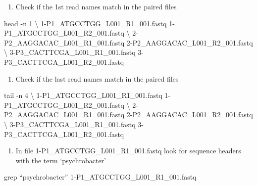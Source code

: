 \documentclass[
  letterpaper,
  DIV=11,
  numbers=noendperiod]{scrreprt}
\newenvironment{Shaded}{\begin{snugshade}}{\end{snugshade}}
\newcommand{\AttributeTok}[1]{\textcolor[rgb]{0.40,0.45,0.13}{#1}}
\newcommand{\DataTypeTok}[1]{\textcolor[rgb]{0.68,0.00,0.00}{#1}}
\newcommand{\FunctionTok}[1]{\textcolor[rgb]{0.28,0.35,0.67}{#1}}
\newcommand{\NormalTok}[1]{\textcolor[rgb]{0.00,0.23,0.31}{#1}}
\providecommand{\tightlist}{%
  \setlength{\itemsep}{0pt}\setlength{\parskip}{0pt}}\usepackage{longtable,booktabs,array}
\begin{document}
\begin{enumerate}
\def\labelenumi{\arabic{enumi}.}
\setcounter{enumi}{6}
\tightlist
\item
  Check if the 1st read names match in the paired files
\end{enumerate}

\begin{Shaded}
\begin{Highlighting}[]
\FunctionTok{head} \AttributeTok{{-}n}\NormalTok{ 1 }\DataTypeTok{\textbackslash{}}
\NormalTok{1{-}P1\_ATGCCTGG\_L001\_R1\_001.fastq 1{-}P1\_ATGCCTGG\_L001\_R2\_001.fastq }\DataTypeTok{\textbackslash{}}
\NormalTok{2{-}P2\_AAGGACAC\_L001\_R1\_001.fastq 2{-}P2\_AAGGACAC\_L001\_R2\_001.fastq }\DataTypeTok{\textbackslash{}}
\NormalTok{3{-}P3\_CACTTCGA\_L001\_R1\_001.fastq 3{-}P3\_CACTTCGA\_L001\_R2\_001.fastq }
\end{Highlighting}
\end{Shaded}

\begin{enumerate}
\def\labelenumi{\arabic{enumi}.}
\setcounter{enumi}{7}
\tightlist
\item
  Check if the last read names match in the paired files
\end{enumerate}

\begin{Shaded}
\begin{Highlighting}[]
\FunctionTok{tail} \AttributeTok{{-}n}\NormalTok{ 4 }\DataTypeTok{\textbackslash{}}
\NormalTok{1{-}P1\_ATGCCTGG\_L001\_R1\_001.fastq 1{-}P1\_ATGCCTGG\_L001\_R2\_001.fastq }\DataTypeTok{\textbackslash{}}
\NormalTok{2{-}P2\_AAGGACAC\_L001\_R1\_001.fastq 2{-}P2\_AAGGACAC\_L001\_R2\_001.fastq }\DataTypeTok{\textbackslash{}}
\NormalTok{3{-}P3\_CACTTCGA\_L001\_R1\_001.fastq 3{-}P3\_CACTTCGA\_L001\_R2\_001.fastq }
\end{Highlighting}
\end{Shaded}

\begin{enumerate}
\def\labelenumi{\arabic{enumi}.}
\setcounter{enumi}{8}
\tightlist
\item
  In file 1-P1\_ATGCCTGG\_L001\_R1\_001.fastq look for sequence headers
  with the term `psychrobacter'
\end{enumerate}

\begin{Shaded}
\begin{Highlighting}[]
\FunctionTok{grep}\NormalTok{ “psychrobacter” 1{-}P1\_ATGCCTGG\_L001\_R1\_001.fastq}
\end{Highlighting}
\end{Shaded}
\end{document}
